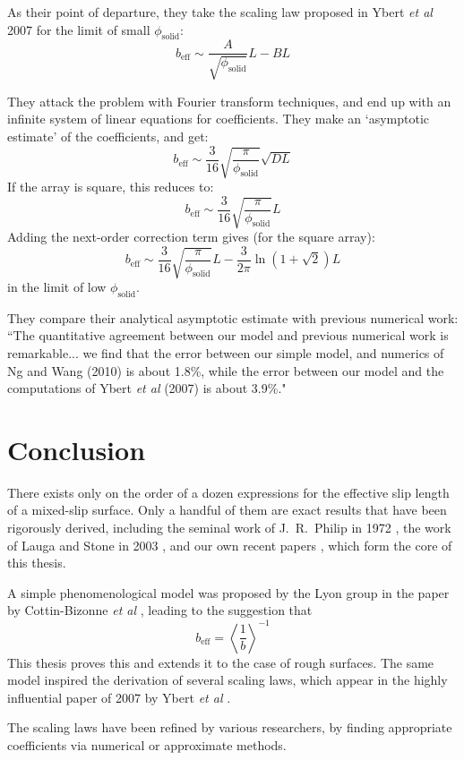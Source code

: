 \documentclass[12pt, a4paper, twoside, openright]{book}
\newcommand{\beff}{\ensuremath{b_{\mathrm{eff}}}}
\newcommand{\phisol}{\ensuremath{\phi_{\mathrm{solid}}}}
\begin{document}
As their point of departure, they take the scaling law proposed in Ybert \emph{et al} 2007 for the limit of small $\phisol$:
\begin{equation}
\beff \sim \frac{A}{\sqrt{\phisol}} L - BL
\end{equation}

They attack the problem with Fourier transform techniques, and end up with an infinite system of linear equations for coefficients.  They make an `asymptotic estimate' of the coefficients, and get:
\begin{equation}
\beff \sim \frac{3}{16} \sqrt{ \frac{\pi}{\phisol}} \sqrt{DL}
\end{equation}
If the array is square, this reduces to:
\begin{equation}
\beff \sim \frac{3}{16} \sqrt{ \frac{\pi}{\phisol}} L
\end{equation}
Adding the next-order correction term gives (for the square array):
\begin{equation}
\beff \sim \frac{3}{16} \sqrt{ \frac{\pi}{\phisol}} L - \frac{3}{2\pi} \ln(1 + \sqrt{2})L
\end{equation}
in the limit of low $\phisol$.

They compare their analytical asymptotic estimate with previous numerical work: ``The quantitative agreement between our model and previous numerical work is remarkable... we find that the error between our simple model, and numerics of Ng and Wang (2010) \cite{NgWang2010} is about 1.8\%, while the error between our model and the computations of Ybert \emph{et al} (2007) \cite{Ybert2007} is about 3.9\%."



\section*{Conclusion}

There exists only on the order of a dozen expressions for the effective slip length of a mixed-slip surface.  Only a handful of them are exact results that have been rigorously derived, including the seminal work of J.\ R.\ Philip in 1972 \cite{Philip1972}, the work of Lauga and Stone in 2003 \cite{LaugaStone2003}, and our own recent papers \cite{HendyLund2007,LundHendy2008,Lund2012}, which form the core of this thesis.

A simple phenomenological model was proposed by the Lyon group in the paper by Cottin-Bizonne \emph{et al} \cite{Cottin-Bizonne2004}, leading to the suggestion that
\begin{equation}
\beff = \left<  \frac{1}{b} \right>^{-1}
\end{equation}
This thesis proves this and extends it to the case of rough surfaces.  The same model inspired the derivation of several scaling laws, which appear in the highly influential paper of 2007 by Ybert \emph{et al} \cite{Ybert2007}.

The scaling laws have been refined by various researchers, by finding appropriate coefficients via numerical or approximate methods.




\end{document}
